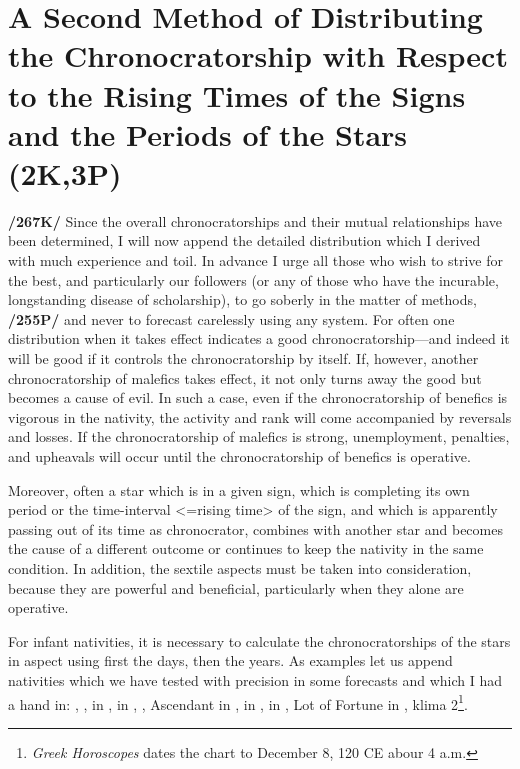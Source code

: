 \section{A Second Method of Distributing the Chronocratorship with Respect to the Rising Times of the Signs and the Periods of the Stars (2K,3P)}

\textbf{/267K/} Since the overall chronocratorships and their mutual relationships have been determined, I will now append the detailed distribution which I derived with much experience and toil. In advance I urge all those who wish to strive for the best, and particularly our followers (or any of those who have the incurable, longstanding
disease of scholarship), to go soberly in the matter of methods, \textbf{/255P/} and never to forecast carelessly using any system. For often one distribution when it takes effect indicates a good chronocratorship—and indeed it will be good if it controls the chronocratorship by itself. If, however, another chronocratorship of malefics takes effect, it not only turns away the good but becomes a cause of evil. In such a case, even if the chronocratorship of benefics is vigorous in the nativity, the activity and rank will come accompanied by reversals and losses. If the chronocratorship of malefics is strong,
unemployment, penalties, and upheavals will occur until the chronocratorship of benefics is operative.

Moreover, often a star which is in a given sign, which is completing its own period or the time-interval <=rising time> of the sign, and which is apparently passing out of its time as chronocrator, combines with another star and becomes the cause of a different outcome or continues to keep the nativity in the same condition. In addition, the sextile aspects must be taken into consideration, because they are powerful and beneficial, particularly when they alone are operative. 

For infant nativities, it is necessary to calculate the chronocratorships of the stars in aspect using first the days, then the years. As examples let us append nativities which we have tested with precision in some forecasts and which I had a hand in: \Sun, \Moon, \Mercury\xspace in \Sagittarius, \Saturn\xspace in \Cancer, \Jupiter, Ascendant in \Scorpio, \Mars\xspace in \Capricorn, \Venus\xspace in \Aquarius, Lot of Fortune in \Scorpio, klima 2\footnote{\textit{Greek Horoscopes} dates the chart to December 8, 120 CE abour 4 a.m.}. 

